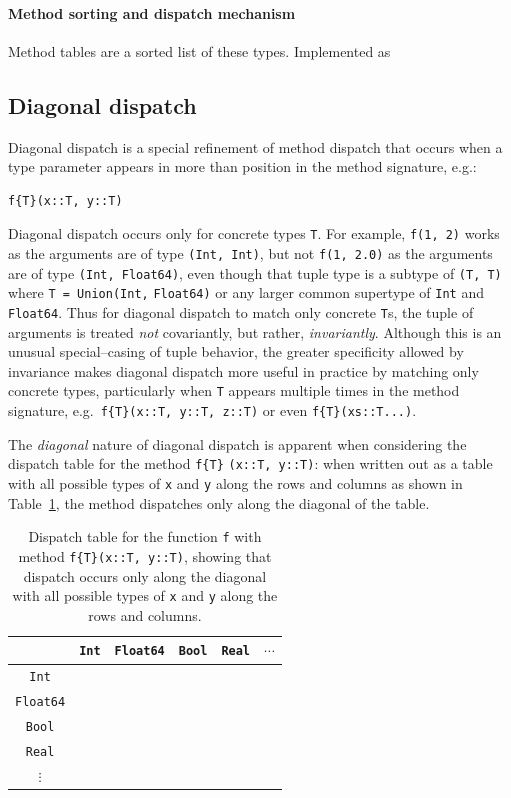 \documentclass[pldi]{sigplanconf-pldi15}
\begin{document}
\paragraph{Method sorting and dispatch mechanism}
Method tables are a sorted list of these types.
Implemented as 

\subsection{Diagonal dispatch}

Diagonal dispatch is a special refinement of method dispatch that occurs when a
type parameter appears in more than position in the method signature, e.g.:

\begin{lstlisting}
f{T}(x::T, y::T)
\end{lstlisting}
%
Diagonal dispatch occurs only for concrete types \verb|T|. For example,
\verb|f(1, 2)| works as the arguments are of type \verb|(Int, Int)|, but not
\verb|f(1, 2.0)| as the arguments are of type \verb|(Int, Float64)|, even
though that tuple type is a subtype of \verb|(T, T)| where
\verb|T = Union(Int,| \verb|Float64)| or any larger common supertype of \verb|Int| and
\verb|Float64|. Thus for diagonal dispatch to match only concrete \verb|T|s,
the tuple of arguments is treated \textit{not} covariantly, but rather,
\textit{invariantly}. Although this is an unusual special--casing of tuple
behavior, the greater specificity allowed by invariance makes diagonal dispatch
more useful in practice by matching only concrete types, particularly when
\verb|T| appears multiple times in the method signature, e.g.\ 
\verb|f{T}(x::T, y::T, z::T)| or even \verb|f{T}(xs::T...)|. 

The \textit{diagonal} nature of diagonal dispatch is apparent when considering
the dispatch table for the method \verb|f{T}| \verb|(x::T, y::T)|: when written
out as a table with all possible types of \texttt{x} and \texttt{y} along the
rows and columns as shown in Table~\ref{tab:diagonal}, the method dispatches
only along the diagonal of the table.

\begin{table}
\begin{tabular}{c | c c c c c}
	& \verb|Int| & \verb|Float64| & \verb|Bool| & \verb|Real| & $\cdots$ \\ \hline
	\verb|Int|     & \checkmark &  &  &  & \\
	\verb|Float64| &  & \checkmark &  &  & \\
	\verb|Bool|    &  &  & \checkmark &  & \\
	\verb|Real|    &  &  &  &  & \\
	$\vdots$       &  &  &  &  &
\end{tabular}
\caption{Dispatch table for the function \texttt{f} with method
\texttt{f\{T\}(x::T, y::T)}, showing that dispatch occurs only along the
diagonal with all possible types of \texttt{x} and \texttt{y} along the rows
and columns.}
\label{tab:diagonal}
\end{table}
\end{document}
